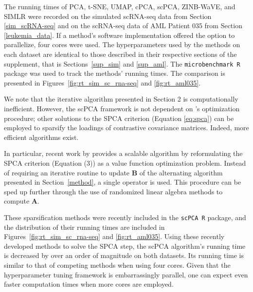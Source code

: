 \documentclass{article}
\begin{document}
The running times of PCA, t-SNE, UMAP, cPCA, scPCA, ZINB-WaVE, and SIMLR were recorded on the simulated scRNA-seq data from Section \ref{sim_scRNA-seq} and on the scRNA-seq data of AML Patient 035 from Section \ref{leukemia_data}.
If a method's software implementation offered the option to parallelize, four cores were used. The hyperparameters used by the methods on each dataset are identical to those described in their respective sections of the supplement, that is Sections~\ref{sup_sim} and \ref{sup_aml}. The \texttt{microbenchmark R} package was used to track the methods' running times. The comparison is presented in Figures~\ref{fig:rt_sim_sc_rna-seq} and \ref{fig:rt_aml035}.

We note that the iterative algorithm presented in Section 2 is computationally inefficient. However, the scPCA framework is not dependent on \citet{Zou2006}'s optimization procedure; other solutions to the SPCA criterion (Equation \eqref{eq:spca}) can be employed to sparsify the loadings of contrastive covariance matrices. Indeed, more efficient algorithms exist.

In particular, recent work by \citet{erichson2018sparse} provides a scalable algorithm by reformulating the SPCA criterion (Equation (3)) as a value function optimization problem. Instead of requiring an iterative routine to update $\mathbf{B}$ of the alternating algorithm presented in Section~\ref{method}, a single operator is used. This procedure can be sped up further through the use of randomized linear algebra methods to compute $\mathbf{A}$.

These sparsification methods were recently included in the \texttt{scPCA R} package, and the distribution of their running times are included in Figures~\ref{fig:rt_sim_sc_rna-seq} and \ref{fig:rt_aml035}. Using these recently developed methods to solve the SPCA step, the scPCA algorithm's running time is decreased by over an order of magnitude on both datasets. Its running time is similar to that of competing methods when using four cores. Given that the hyperparameter tuning framework is embarrassingly parallel, one can expect even faster computation times when more cores are employed.
\end{document}
